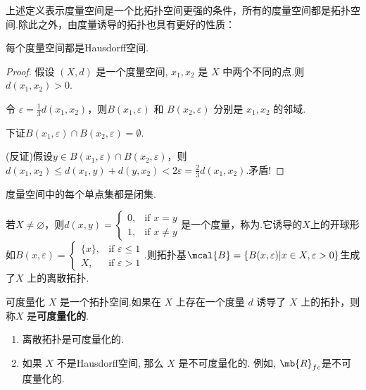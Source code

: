 上述定义表示度量空间是一个比拓扑空间更强的条件，所有的度量空间都是拓扑空间.除此之外，由度量诱导的拓扑也具有更好的性质：
\begin{proposition}
    每个度量空间都是Hausdorff空间.
\end{proposition}
\begin{proof}
    假设 $(X,d)$ 是一个度量空间, $x_1,x_2$ 是 $X$ 中两个不同的点.则$d(x_1,x_2)>0$.\par
    令 $\varepsilon = \frac{1}{3}d(x_1,x_2)$，则$B(x_1,\varepsilon)$ 和 $B(x_2,\varepsilon)$ 分别是 $x_1,x_2$ 的邻域.\par
    下证$B(x_1,\varepsilon)\cap B(x_2,\varepsilon)=\emptyset$.\par
    (反证)假设$y\in B(x_1,\varepsilon)\cap B(x_2,\varepsilon)$，则$d(x_1,x_2)\leq d(x_1,y)+d(y,x_2) < 2\varepsilon = \frac{2}{3}d(x_1,x_2)$.矛盾!
\end{proof}
\begin{corollary}
    度量空间中的每个单点集都是闭集.
\end{corollary}

\begin{instance}
    若$X\neq\varnothing$，则$d(x,y)=\begin{cases} 0, & \text{if } x=y \\ 1, & \text{if } x\neq y \end{cases}$是一个度量，称为.它诱导的$X$上的开球形如$B(x,\varepsilon) = \begin{cases} \{x\}, & \text{if } \varepsilon\leq 1 \\ X, & \text{if } \varepsilon > 1 \end{cases}$.则拓扑基$\mcal{B}=\{B(x,\varepsilon)|x\in X, \varepsilon>0\}$生成了$X$ 上的离散拓扑.
\end{instance}



\begin{definition}{可度量化}
    $X$ 是一个拓扑空间.如果在 $X$ 上存在一个度量 $d$ 诱导了 $X$ 上的拓扑，则称$X$ 是\textbf{可度量化的}.
\end{definition}

\begin{instance}
    \begin{enumerate}
        \item 离散拓扑是可度量化的.
        \item 如果 $X$ 不是Hausdorff空间, 那么 $X$ 是不可度量化的. 例如, $\mb{R}_{fc}$是不可度量化的.
    \end{enumerate}
\end{instance}
